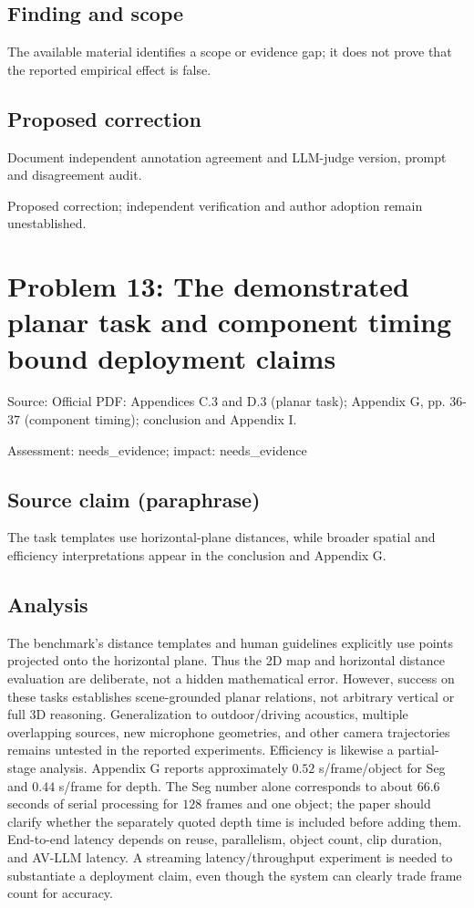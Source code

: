 \documentclass[11pt]{article}
\begin{document}
\subsection*{Finding and scope}

The available material identifies a scope or evidence gap; it does not prove that the reported empirical effect is false.

\subsection*{Proposed correction}

Document independent annotation agreement and LLM-judge version, prompt and disagreement audit.

Proposed correction; independent verification and author adoption remain unestablished.

\section*{Problem 13: The demonstrated planar task and component timing bound deployment claims}

Source: Official PDF: Appendices C.3 and D.3 (planar task); Appendix G, pp. 36-37 (component timing); conclusion and Appendix I.

Assessment: needs\_evidence; impact: needs\_evidence

\subsection*{Source claim (paraphrase)}

The task templates use horizontal-plane distances, while broader spatial and efficiency interpretations appear in the conclusion and Appendix G.

\subsection*{Analysis}

The benchmark's distance templates and human guidelines explicitly use points projected onto the horizontal plane. Thus the 2D map and horizontal distance evaluation are deliberate, not a hidden mathematical error. However, success on these tasks establishes scene-grounded planar relations, not arbitrary vertical or full 3D reasoning. Generalization to outdoor/driving acoustics, multiple overlapping sources, new microphone geometries, and other camera trajectories remains untested in the reported experiments. Efficiency is likewise a partial-stage analysis. Appendix G reports approximately \(0.52\) s/frame/object for Seg and \(0.44\) s/frame for depth. The Seg number alone corresponds to about \(66.6\) seconds of serial processing for \(128\) frames and one object; the paper should clarify whether the separately quoted depth time is included before adding them. End-to-end latency depends on reuse, parallelism, object count, clip duration, and AV-LLM latency. A streaming latency/throughput experiment is needed to substantiate a deployment claim, even though the system can clearly trade frame count for accuracy.
\end{document}
